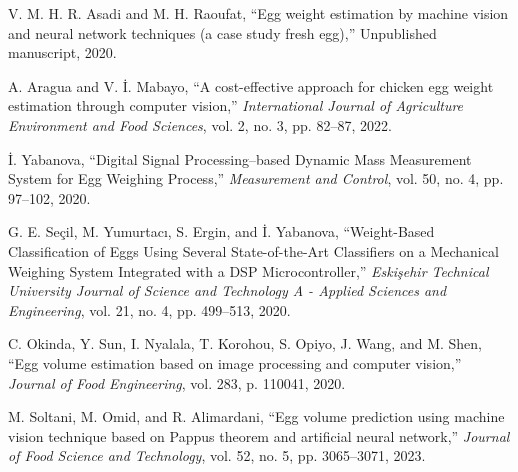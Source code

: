\documentclass[conference]{IEEEtran}
\begin{document}
\begin{thebibliography}{00}
		 V. M. H. R. Asadi and M. H. Raoufat, “Egg weight estimation by machine vision and neural network techniques (a case study fresh egg),” Unpublished manuscript, 2020.
		
		 A. Aragua and V. İ. Mabayo, “A cost-effective approach for chicken egg weight estimation through computer vision,” \textit{International Journal of Agriculture Environment and Food Sciences}, vol. 2, no. 3, pp. 82–87, 2022.
		
		 İ. Yabanova, “Digital Signal Processing–based Dynamic Mass Measurement System for Egg Weighing Process,” \textit{Measurement and Control}, vol. 50, no. 4, pp. 97–102, 2020.
		
		 G. E. Seçil, M. Yumurtacı, S. Ergin, and İ. Yabanova, “Weight-Based Classification of Eggs Using Several State-of-the-Art Classifiers on a Mechanical Weighing System Integrated with a DSP Microcontroller,” \textit{Eskişehir Technical University Journal of Science and Technology A - Applied Sciences and Engineering}, vol. 21, no. 4, pp. 499–513, 2020.
		
		 C. Okinda, Y. Sun, I. Nyalala, T. Korohou, S. Opiyo, J. Wang, and M. Shen, “Egg volume estimation based on image processing and computer vision,” \textit{Journal of Food Engineering}, vol. 283, p. 110041, 2020.
		
		 M. Soltani, M. Omid, and R. Alimardani, “Egg volume prediction using machine vision technique based on Pappus theorem and artificial neural network,” \textit{Journal of Food Science and Technology}, vol. 52, no. 5, pp. 3065–3071, 2023.
		
	\end{thebibliography}
	
\end{document}
